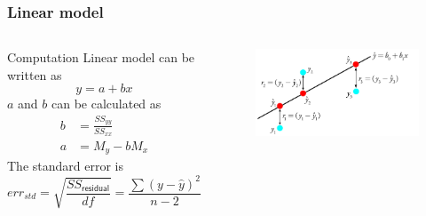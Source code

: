 \documentclass[10pt, compress]{beamer}
\begin{document}
\begin{frame}
    \frametitle{Linear model}
    \begin{columns}
        \begin{block}{Computation}
            Linear model can be written as
            \begin{equation}
                y = a + bx
            \end{equation}
            $a$ and $b$ can be calculated as
            \begin{align}
                b & = \frac{SS_{yy}}{SS_{xx}} \\
                a & = M_{y} - bM_{x}
            \end{align}
            The standard error is
            \begin{equation}
                err_{std} = \sqrt{\frac{SS_{\mathsf{residual}}}{df}} = \frac{\sum (y- \hat{y})^2}{n-2}
            \end{equation}
        \end{block}
        \begin{block}{}
            \begin{figure}
                \begin{center}
                    \includegraphics[scale=0.4]{img/Figure5_10.jpg}
                \end{center}
            \end{figure}
        \end{block}
    \end{columns}
\end{frame}
\end{document}

